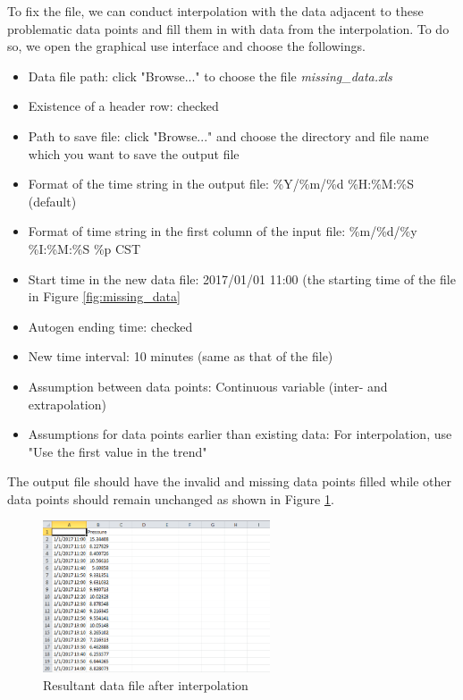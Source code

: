 \documentclass[12pt,a4paper]{article}
\begin{document}
To fix the file, we can conduct interpolation with the data adjacent to these problematic data points and fill them in with data from the interpolation.
To do so, we open the graphical use interface and choose the followings.
\begin{itemize}
\item Data file path: click "Browse..." to choose the file \emph{missing\_data.xls}
\item Existence of a header row: checked
\item Path to save file: click "Browse..." and choose the directory and file name which you want to save the output file
\item Format of the time string in the output file: \%Y/\%m/\%d \%H:\%M:\%S (default)
\item Format of time string in the first column of the input file: \%m/\%d/\%y \%I:\%M:\%S \%p CST
\item Start time in the new data file: 2017/01/01 11:00 (the starting time of the file in Figure \ref{fig:missing_data}
\item Autogen ending time: checked
\item New time interval: 10 minutes (same as that of the file)
\item Assumption between data points: Continuous variable (inter- and extrapolation)
\item Assumptions for data points earlier than existing data: For interpolation, use "Use the first value in the trend"
\end{itemize}

The output file should have the invalid and missing data points filled while other data points should remain unchanged as shown in Figure \ref{fig:missing_data_result}.

\begin{figure}[H]
\centering
\includegraphics[width=0.6\textwidth]{missing_data_result.png}
\caption{Resultant data file after interpolation}
\label{fig:missing_data_result}
\end{figure}
\end{document}
